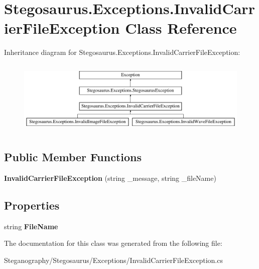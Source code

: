 \hypertarget{class_stegosaurus_1_1_exceptions_1_1_invalid_carrier_file_exception}{}\section{Stegosaurus.\+Exceptions.\+Invalid\+Carrier\+File\+Exception Class Reference}
\label{class_stegosaurus_1_1_exceptions_1_1_invalid_carrier_file_exception}
Inheritance diagram for Stegosaurus.\+Exceptions.\+Invalid\+Carrier\+File\+Exception\+:\begin{figure}[H]
\begin{center}
\leavevmode
\includegraphics[height=3.578275cm]{class_stegosaurus_1_1_exceptions_1_1_invalid_carrier_file_exception}
\end{center}
\end{figure}
\subsection*{Public Member Functions}
\begin{DoxyCompactItemize}
\item 
{\bfseries Invalid\+Carrier\+File\+Exception} (string \+\_\+message, string \+\_\+file\+Name)\hypertarget{class_stegosaurus_1_1_exceptions_1_1_invalid_carrier_file_exception_a5b68424e30550e6bbec300316d10e205}{}\label{class_stegosaurus_1_1_exceptions_1_1_invalid_carrier_file_exception_a5b68424e30550e6bbec300316d10e205}

\end{DoxyCompactItemize}
\subsection*{Properties}
\begin{DoxyCompactItemize}
\item 
string {\bfseries File\+Name}\hypertarget{class_stegosaurus_1_1_exceptions_1_1_invalid_carrier_file_exception_a029be7e676ff429dc4f51163d9f75d2c}{}\label{class_stegosaurus_1_1_exceptions_1_1_invalid_carrier_file_exception_a029be7e676ff429dc4f51163d9f75d2c}

\end{DoxyCompactItemize}


The documentation for this class was generated from the following file\+:\begin{DoxyCompactItemize}
\item 
Steganography/\+Stegosaurus/\+Exceptions/Invalid\+Carrier\+File\+Exception.\+cs\end{DoxyCompactItemize}
